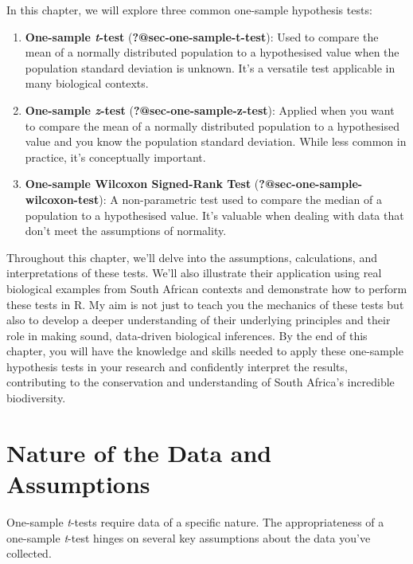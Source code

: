 \documentclass[
  letterpaper,
]{book}
\providecommand{\tightlist}{%
  \setlength{\itemsep}{0pt}\setlength{\parskip}{0pt}}\usepackage{longtable,booktabs,array}
\begin{document}
In this chapter, we will explore three common one-sample hypothesis
tests:

\vspace{6pt}

\begin{enumerate}
\def\labelenumi{\arabic{enumi}.}
\tightlist
\item
  \textbf{One-sample \emph{t}-test} (\textbf{?@sec-one-sample-t-test}):
  Used to compare the mean of a normally distributed population to a
  hypothesised value when the population standard deviation is unknown.
  It's a versatile test applicable in many biological contexts.
\item
  \textbf{One-sample \emph{z}-test} (\textbf{?@sec-one-sample-z-test}):
  Applied when you want to compare the mean of a normally distributed
  population to a hypothesised value and you know the population
  standard deviation. While less common in practice, it's conceptually
  important.
\item
  \textbf{One-sample Wilcoxon Signed-Rank Test}
  (\textbf{?@sec-one-sample-wilcoxon-test}): A non-parametric test used
  to compare the median of a population to a hypothesised value. It's
  valuable when dealing with data that don't meet the assumptions of
  normality.
\end{enumerate}

\vspace{6pt}

Throughout this chapter, we'll delve into the assumptions, calculations,
and interpretations of these tests. We'll also illustrate their
application using real biological examples from South African contexts
and demonstrate how to perform these tests in R. My aim is not just to
teach you the mechanics of these tests but also to develop a deeper
understanding of their underlying principles and their role in making
sound, data-driven biological inferences. By the end of this chapter,
you will have the knowledge and skills needed to apply these one-sample
hypothesis tests in your research and confidently interpret the results,
contributing to the conservation and understanding of South Africa's
incredible biodiversity.

\section{Nature of the Data and
Assumptions}\label{sec-chapter2_assumptions}

One-sample \emph{t}-tests require data of a specific nature. The
appropriateness of a one-sample \emph{t}-test hinges on several key
assumptions about the data you've collected.
\end{document}
